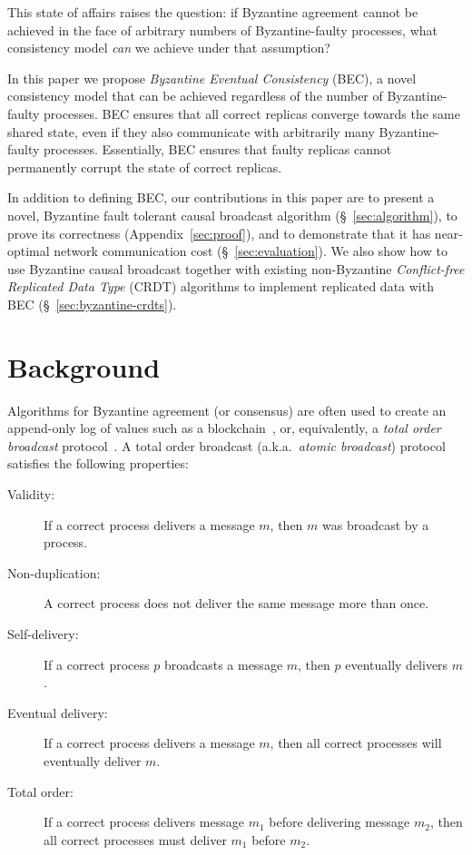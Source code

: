 \documentclass[a4paper,anonymous,USenglish]{lipics-v2019}
\begin{document}
This state of affairs raises the question: if Byzantine agreement cannot be achieved in the face of arbitrary numbers of Byzantine-faulty processes, what consistency model \emph{can} we achieve under that assumption?

In this paper we propose \emph{Byzantine Eventual Consistency} (BEC), a novel consistency model that can be achieved regardless of the number of Byzantine-faulty processes.
BEC ensures that all correct replicas converge towards the same shared state, even if they also communicate with arbitrarily many Byzantine-faulty processes.
Essentially, BEC ensures that faulty replicas cannot permanently corrupt the state of correct replicas.

In addition to defining BEC, our contributions in this paper are to present a novel, Byzantine fault tolerant causal broadcast algorithm (\S~\ref{sec:algorithm}), to prove its correctness (Appendix~\ref{sec:proof}), and to demonstrate that it has near-optimal network communication cost (\S~\ref{sec:evaluation}).
We also show how to use Byzantine causal broadcast together with existing non-Byzantine \emph{Conflict-free Replicated Data Type} (CRDT) algorithms to implement replicated data with BEC (\S~\ref{sec:byzantine-crdts}).


\section{Background}\label{sec:background}

Algorithms for Byzantine agreement (or consensus) are often used to create an append-only log of values such as a blockchain~\cite{Bano:2019}, or, equivalently, a \emph{total order broadcast} protocol~\cite{Cachin:2011wt,Defago:2004ji}.
A total order broadcast (a.k.a.\ \emph{atomic broadcast}) protocol satisfies the following properties:

\begin{description}
\item[Validity:] If a correct process delivers a message $m$, then $m$ was broadcast by a process.
\item[Non-duplication:] A correct process does not deliver the same message more than once.
\item[Self-delivery:] If a correct process $p$ broadcasts a message $m$, then $p$ eventually delivers $m$.
\item[Eventual delivery:] If a correct process delivers a message $m$, then all correct processes will eventually deliver $m$.
\item[Total order:] If a correct process delivers message $m_1$ before delivering message $m_2$, then all correct processes must deliver $m_1$ before $m_2$.
\end{description}
\end{document}
